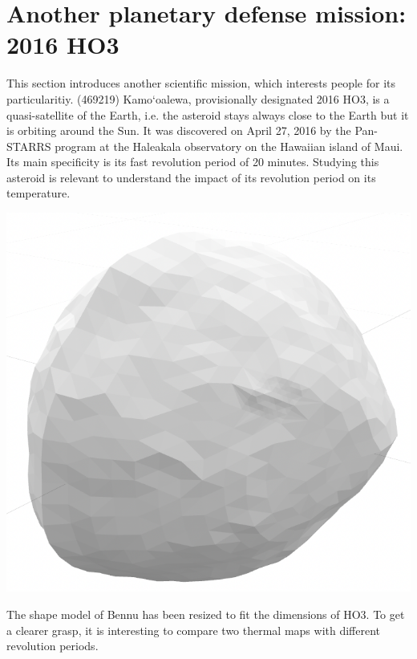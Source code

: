 \section{Another planetary defense mission: 2016 HO3}
\label{sec:7}

This section introduces another scientific mission, which interests people for its particularitiy. (469219) Kamo‘oalewa, provisionally designated 2016 HO3, is a quasi-satellite of the Earth, i.e. the asteroid stays always close to the Earth but it is orbiting around the Sun. It was discovered on April 27, 2016 by the Pan-STARRS program at the Haleakala observatory on the Hawaiian island of Maui. Its main specificity is its fast revolution period of 20 minutes. Studying this asteroid is relevant to understand the impact of its revolution period on its temperature.

\begin{center}
    \includegraphics[width=0.5\linewidth]{rsc/HO3_shapemodel.png}
    \label{fig:7.1}
\end{center}

The shape model of Bennu has been resized to fit the dimensions of HO3. To get a clearer grasp, it is interesting to compare two thermal maps with different revolution periods. 


